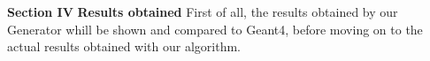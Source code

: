 \documentclass[8 pt]{beamer}
\begin{document}
%










\begin{frame}{}
\centering
	\huge{\textbf{\color{mycolor} Section IV}} \newline
	\LARGE{\textbf{\color{mycolor} Results obtained \color{black}}} \vfill
\Large{First of all, the results obtained by our Generator whill be shown and compared to Geant4, before moving on to the actual results obtained with our algorithm.} \vfill
\end{frame}
\end{document}
